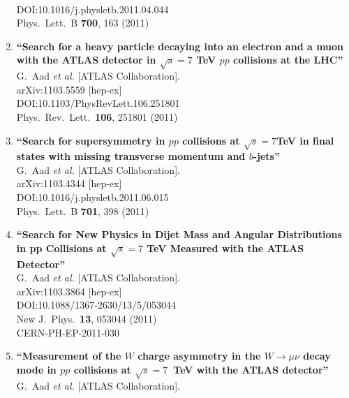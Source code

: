 \documentclass{article}
\begin{document}
\begin{enumerate}
  \\{}DOI:10.1016/j.physletb.2011.04.044
  \\{}Phys.\ Lett.\ B {\bf 700}, 163 (2011)
\item%
{\bf ``Search for a heavy particle decaying into an electron and a muon with the ATLAS detector in $\sqrt{s}=7$ TeV $pp$ collisions at the LHC''}
  \\{}G.~Aad {\it et al.} [ATLAS Collaboration].
  \\{}arXiv:1103.5559 [hep-ex]
  \\{}DOI:10.1103/PhysRevLett.106.251801
  \\{}Phys.\ Rev.\ Lett.\  {\bf 106}, 251801 (2011)
\item%
{\bf ``Search for supersymmetry in $pp$ collisions at $\sqrt{s}=7$TeV in final states with missing transverse momentum and $b$-jets''}
  \\{}G.~Aad {\it et al.} [ATLAS Collaboration].
  \\{}arXiv:1103.4344 [hep-ex]
  \\{}DOI:10.1016/j.physletb.2011.06.015
  \\{}Phys.\ Lett.\ B {\bf 701}, 398 (2011)
\item%
{\bf ``Search for New Physics in Dijet Mass and Angular Distributions in pp Collisions at $\sqrt{s} = 7$ TeV Measured with the ATLAS Detector''}
  \\{}G.~Aad {\it et al.} [ATLAS Collaboration].
  \\{}arXiv:1103.3864 [hep-ex]
  \\{}DOI:10.1088/1367-2630/13/5/053044
  \\{}New J.\ Phys.\  {\bf 13}, 053044 (2011)
  \\{}CERN-PH-EP-2011-030
\item%
{\bf ``Measurement of the $W$ charge asymmetry in the $W \to \mu \nu$ decay mode in $pp$ collisions at $\sqrt s=7$ TeV with the ATLAS detector''}
  \\{}G.~Aad {\it et al.} [ATLAS Collaboration].

\end{enumerate}
\end{document}
